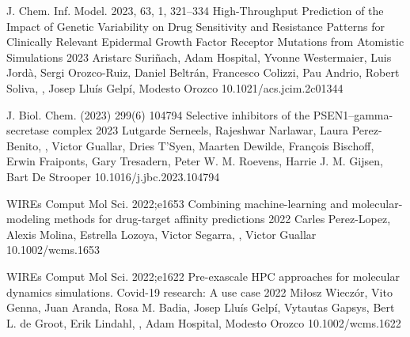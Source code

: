 

\begin{cventries}

  \pubentry
    {J. Chem. Inf. Model. 2023, 63, 1, 321–334} %
    {High-Throughput Prediction of the Impact of Genetic Variability on Drug Sensitivity and Resistance Patterns for Clinically Relevant Epidermal Growth Factor Receptor Mutations from Atomistic Simulations} %
    {2023} %
    {} %
    {Aristarc Suriñach, Adam Hospital, Yvonne Westermaier, Luis Jordà, Sergi Orozco-Ruiz, Daniel Beltrán, Francesco Colizzi, Pau Andrio, Robert Soliva, , Josep Lluís Gelpí, Modesto Orozco} %
    {} %
    {10.1021/acs.jcim.2c01344} %

  \pubentry
    {J. Biol. Chem. (2023) 299(6) 104794} %
    {Selective inhibitors of the PSEN1–gamma-secretase complex} %
    {2023} %
    {} %
    {Lutgarde Serneels, Rajeshwar Narlawar, Laura Perez-Benito, , Victor Guallar, Dries T’Syen, Maarten Dewilde, François Bischoff, Erwin Fraiponts, Gary Tresadern, Peter W. M. Roevens, Harrie J. M. Gijsen, Bart De Strooper} %
    {} %
    {10.1016/j.jbc.2023.104794} %

  \pubentry
    {WIREs Comput Mol Sci. 2022;e1653} %
    {Combining machine-learning and molecular-modeling methods for drug-target affinity predictions} %
    {2022} %
    {} %
    {Carles Perez-Lopez, Alexis Molina, Estrella Lozoya, Victor Segarra, , Victor Guallar} %
    {} %
    {10.1002/wcms.1653} %

  \pubentry
    {WIREs Comput Mol Sci. 2022;e1622} %
    {Pre-exascale HPC approaches for molecular dynamics simulations. Covid-19 research: A use case} %
    {2022} %
    {} %
    {Miłosz Wieczór, Vito Genna, Juan Aranda, Rosa M. Badia, Josep Lluís Gelpí, Vytautas Gapsys, Bert L. de Groot, Erik Lindahl, , Adam Hospital, Modesto Orozco} %
    {} %
    {10.1002/wcms.1622} %


\end{cventries}
